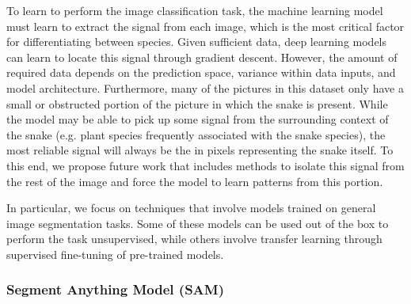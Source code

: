 \documentclass[]{ceurart}
\begin{document}
To learn to perform the image classification task, the machine learning model must learn to extract the signal from each image, which is the most critical factor for differentiating between species. 
Given sufficient data, deep learning models can learn to locate this signal through gradient descent. 
However, the amount of required data depends on the prediction space, variance within data inputs, and model architecture. 
Furthermore, many of the pictures in this dataset only have a small or obstructed portion of the picture in which the snake is present. 
While the model may be able to pick up some signal from the surrounding context of the snake (e.g. plant species frequently associated with the snake species), the most reliable signal will always be the in pixels representing the snake itself. 
To this end, we propose future work that includes methods to isolate this signal from the rest of the image and force the model to learn patterns from this portion.

In particular, we focus on techniques that involve models trained on general image segmentation tasks. 
Some of these models can be used out of the box to perform the task unsupervised, while others involve transfer learning through supervised fine-tuning of pre-trained models. 

\subsubsection{Segment Anything Model (SAM)}
\end{document}
